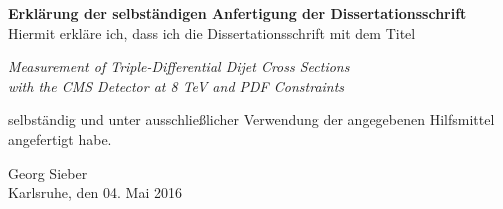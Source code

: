 \cleardoublepage
\thispagestyle{empty}
\null\vspace{10cm}
\noindent
{\sffamily \textbf{Erklärung der selbständigen Anfertigung der
Dissertationsschrift}}\\[1cm]

\noindent
Hiermit erkläre ich, dass ich die Dissertationsschrift mit dem Titel
%
\begin{center}
 \guillemotright
 \textit{Measurement of Triple-Differential Dijet Cross Sections\\
            with the CMS Detector at 8 TeV and PDF Constraints}\guillemotleft\\[1.5ex]

\end{center}
%
selbständig und unter ausschließlicher Verwendung der angegebenen Hilfsmittel\\
angefertigt habe.
\vspace{12ex}

\noindent
\hrulefill\hspace{9cm}

\noindent
Georg Sieber\\
\noindent
Karlsruhe, den 04. Mai 2016


